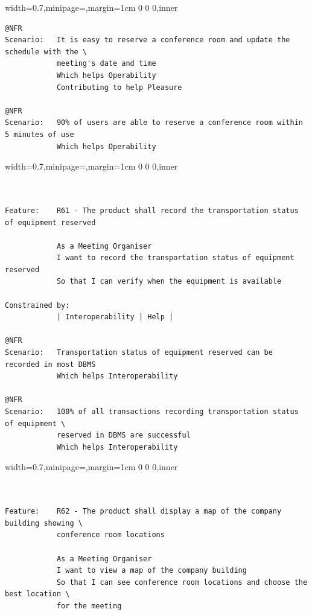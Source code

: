 \documentclass[dissertation,final]{softeng}
\newenvironment{featurecode}[1]
{ \lrbox\featurebox \begin{adjustbox}{width=#1\textwidth,minipage=\textwidth,margin=1cm 0 0 0,inner} }
{ \end{adjustbox}\endlrbox}
\newenvironment{featurelist}[2]
{
\newcommand{\setcaption}{\caption{#1}}
\newcommand{\setlabel}{\label{#2}}
}
{\begin{listing}[h!]\centering\usebox\featurebox\setcaption\setlabel\end{listing}}
\begin{document}
\begin{appendices}
\begin{featurelist}{R60 -- Each time a conference room is reserved the schedule shall be updated}{lst:feature_r60}
\begin{featurecode}{0.7}
\begin{verbatim}
@NFR
Scenario:   It is easy to reserve a conference room and update the schedule with the \
            meeting's date and time
            Which helps Operability
            Contributing to help Pleasure

@NFR	
Scenario:   90% of users are able to reserve a conference room within 5 minutes of use
            Which helps Operability
\end{verbatim}
\end{featurecode}
\end{featurelist}

\begin{featurelist}{R61 -- The product shall record the transportation status of equipment reserved}{lst:feature_r61}
\begin{featurecode}{0.7}
\begin{verbatim}


Feature:    R61 - The product shall record the transportation status of equipment reserved

            As a Meeting Organiser
            I want to record the transportation status of equipment reserved
            So that I can verify when the equipment is available
	
Constrained by:
            | Interoperability | Help |

@NFR	
Scenario:   Transportation status of equipment reserved can be recorded in most DBMS
            Which helps Interoperability

@NFR	
Scenario:   100% of all transactions recording transportation status of equipment \
            reserved in DBMS are successful
            Which helps Interoperability
\end{verbatim}
\end{featurecode}
\end{featurelist}
\clearpage

\begin{featurelist}{R62 -- The product shall display a map of the company building}{lst:feature_r62}
\begin{featurecode}{0.7}
\begin{verbatim}


Feature:    R62 - The product shall display a map of the company building showing \
            conference room locations

            As a Meeting Organiser
            I want to view a map of the company building
            So that I can see conference room locations and choose the best location \
            for the meeting
	

\end{verbatim}
\end{featurecode}
\end{featurelist}
\end{appendices}
\end{document}
